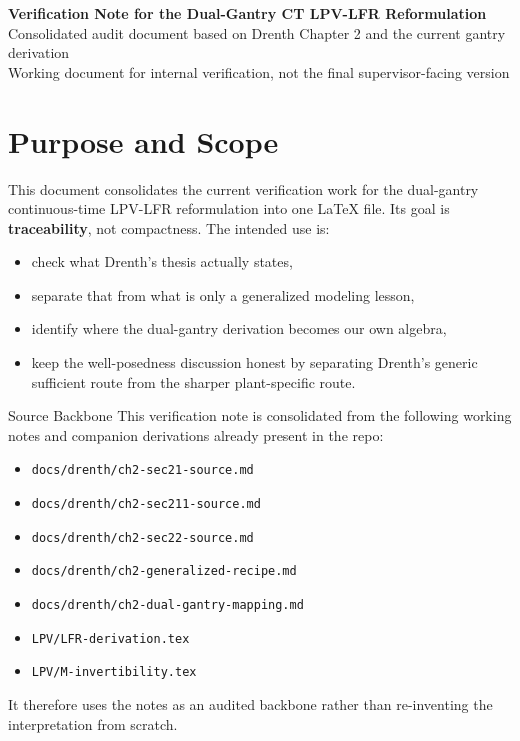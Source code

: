 \documentclass[11pt]{article}
\begin{document}
\begin{center}
    {\LARGE\bfseries Verification Note for the Dual-Gantry CT LPV-LFR Reformulation}\\[0.5em]
    {\large Consolidated audit document based on Drenth Chapter 2 and the current gantry derivation}\\[0.3em]
    {\normalsize Working document for internal verification, not the final supervisor-facing version}
\end{center}

\vspace{0.7em}

\section{Purpose and Scope}

This document consolidates the current verification work for the dual-gantry
continuous-time LPV-LFR reformulation into one \LaTeX{} file. Its goal is
\textbf{traceability}, not compactness. The intended use is:

\begin{itemize}[leftmargin=1.2em]
    \item check what Drenth's thesis actually states,
    \item separate that from what is only a generalized modeling lesson,
    \item identify where the dual-gantry derivation becomes our own algebra,
    \item keep the well-posedness discussion honest by separating Drenth's
    generic sufficient route from the sharper plant-specific route.
\end{itemize}

\begin{notebox}{Source Backbone}
This verification note is consolidated from the following working notes and
companion derivations already present in the repo:
\begin{itemize}[leftmargin=1.2em]
    \item \texttt{docs/drenth/ch2-sec21-source.md}
    \item \texttt{docs/drenth/ch2-sec211-source.md}
    \item \texttt{docs/drenth/ch2-sec22-source.md}
    \item \texttt{docs/drenth/ch2-generalized-recipe.md}
    \item \texttt{docs/drenth/ch2-dual-gantry-mapping.md}
    \item \texttt{LPV/LFR-derivation.tex}
    \item \texttt{LPV/M-invertibility.tex}
\end{itemize}
It therefore uses the notes as an audited backbone rather than re-inventing the
interpretation from scratch.
\end{notebox}
\end{document}

